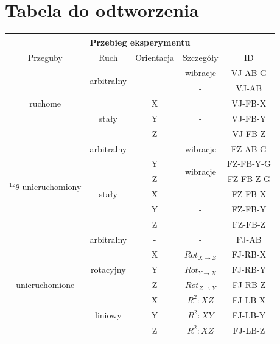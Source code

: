 \documentclass[10pt,a4paper]{article}
\begin{document}
\section{Tabela do odtworzenia}

\begin{center}
	\begin{tabular}{c||c|c|c|c}
		\multicolumn{5}{c}{\textbf{Przebieg eksperymentu}} \\ \hline \hline \hline
		Przeguby & Ruch & Orientacja & Szczegóły & ID\\ \hline \hline
		
		\multirow{5}{*}{ruchome} & \multirow{2}{*}{arbitralny} & \multirow{2}{*}{-} & wibracje & VJ-AB-G \\ \cline{4-5}
		& & & - & VJ-AB \\ \cline{2-5}
		& \multirow{3}{*}{stały} &  X &  \multirow{3}{*}{-} & VJ-FB-X \\ \cline{3-3} \cline{5-5}
		& &  Y & & VJ-FB-Y \\ \cline{3-3}  \cline{5-5}
		& &  Z & & VJ-FB-Z \\ \hline \hline
		
		\multirow{6}{*}{$^{1z}\theta$ unieruchomiony} & arbitralny & - & wibracje & FZ-AB-G \\ \cline{2-5}
		& \multirow{5}{*}{stały} &  Y &  \multirow{2}{*}{wibracje} & FZ-FB-Y-G \\ \cline{3-3}  \cline{5-5}
		& &  Z & & FZ-FB-Z-G \\ \cline{3-5}  \cline{5-5}
		& &  X &  \multirow{3}{*}{-} & FZ-FB-X \\ \cline{3-3}  \cline{5-5}	
		& &  Y & & FZ-FB-Y \\ \cline{3-3}  \cline{5-5}
		& &  Z & & FZ-FB-Z \\ \hline \hline
		
		\multirow{7}{*}{unieruchomione} & arbitralny & - & - &  FJ-AB \\ \cline{2-5}
		& \multirow{3}{*}{rotacyjny} &  X & $Rot_{X \rightarrow Z}$ & FJ-RB-X \\ \cline{3-5}
		& &  Y & $Rot_{Y \rightarrow X}$ & FJ-RB-Y \\ \cline{3-5}
		& &  Z & $Rot_{Z \rightarrow Y}$ & FJ-RB-Z \\ \cline{2-5}
		& \multirow{3}{*}{liniowy} &  X &  $R^{2}: XZ$ &  FJ-LB-X \\ \cline{3-5}
		& &  Y &  $R^{2}: XY$ & FJ-LB-Y \\ \cline{3-5}
		& &  Z &  $R^{2}: XZ$ & FJ-LB-Z \\ 
	\end{tabular}
\end{center}
\end{document}
